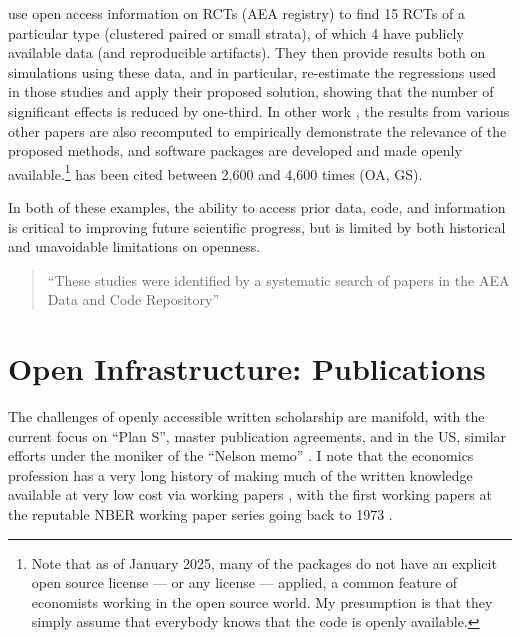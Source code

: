 \documentclass{article}
\begin{document}
\citet{de_chaisemartin_at_2024} use open access information on RCTs (AEA registry) to find 15 RCTs of a particular type (clustered paired or small strata), of which 4 have publicly available data (and reproducible artifacts). They then provide results both on simulations using these data, and in particular, re-estimate the regressions used in those studies and apply their proposed solution, showing that the number of significant effects is reduced by one-third. In other work \citep{de_chaisemartin_two-way_2020,de_chaisemartin_difference--differences_2024}, the results from various other papers are also recomputed to empirically demonstrate the relevance of the proposed methods, and software packages \citep[e.g.][]{de_chaisemartin_chaisemartinpackagesdid_multiplegt_dyn_2025} are developed and made openly available.\footnote{Note that as of January 2025, many of the packages do not have an explicit open source license --- or any license --- applied, a common feature of economists working in the open source world. My presumption is that they simply assume that everybody knows that the code is openly available.} \citet{de_chaisemartin_two-way_2020} has been cited between 2,600 and 4,600 times (OA, GS).


In both of these examples, the ability to access prior data, code, and information is critical to improving future scientific progress, but is limited by both historical and unavoidable limitations on openness.


%
\begin{quote}
    ``These studies were identified by a systematic search of papers in the AEA Data and Code Repository''
\end{quote}



\section{Open Infrastructure: Publications}
\label{sec:publications}

The challenges of openly accessible written scholarship are manifold, with the current focus on ``Plan S'', master publication agreements, and in the US, similar efforts under the moniker of the ``Nelson memo'' \parencite{brainard_white_2022,brainard_us_2024}. I note that the economics profession has a very long history of making much of the written knowledge available at very low cost via working papers \parencite{vilhuber_reproducibility_2020}, with the first working papers at the reputable NBER working paper series going back to 1973 \parencite{welch_education_1973}.
\end{document}
